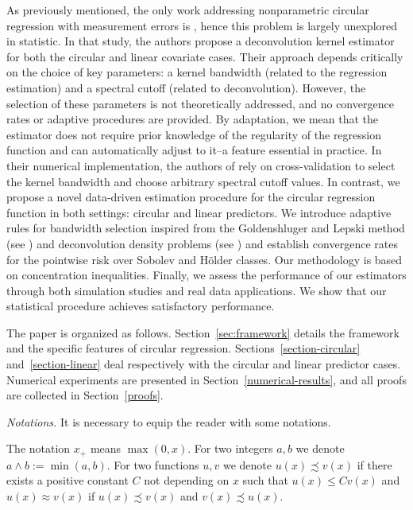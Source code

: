 \documentclass[11pt,a4paper,openany]{article}
\begin{document}
As previously mentioned, the only work addressing nonparametric circular regression with measurement errors is \cite{Di-Marzio-Fensore-Taylor}, hence this problem is largely unexplored in statistic. In that study, the authors propose a deconvolution kernel estimator for both the circular and linear covariate cases. Their approach depends critically on the choice of key parameters: a kernel  bandwidth (related to the regression estimation) and a spectral cutoff (related to deconvolution). However, the selection of these parameters is not theoretically addressed, and no convergence rates or adaptive procedures are provided. By adaptation, we mean that the estimator does not require prior knowledge of the regularity of the regression function and can automatically adjust to it--a feature essential in practice. In their numerical implementation, the authors of \cite{Di-Marzio-Fensore-Taylor} rely on cross-validation to select the kernel bandwidth and choose arbitrary spectral cutoff values. In contrast, we propose a novel data-driven estimation procedure for the circular regression function in both settings: circular and linear predictors. We introduce adaptive rules for bandwidth selection inspired from the Goldenshluger and Lepski method (see \cite{Goldenshluger-Lepski:2011}) and deconvolution density problems (see \cite{Comte-Lacour}) and establish convergence rates for the pointwise risk over Sobolev and H\"older classes. Our methodology is based on concentration inequalities. Finally, we assess the performance of our estimators through both simulation studies and real data applications. We show that our statistical procedure achieves satisfactory performance.
\medskip

The paper is organized as follows. Section~\ref{sec:framework} details the framework and the specific features of circular regression. Sections~\ref{section-circular} and~\ref{section-linear} deal respectively with the circular and linear predictor cases. Numerical experiments are presented in Section~\ref{numerical-results}, and all proofs are collected in Section~\ref{proofs}.



\medskip

 \textit{Notations.} It is necessary to equip the reader with some notations. 
 \medskip
 
 The notation $x_+$ means $\max(0,x).$ For two integers $a,b$ we denote $a \wedge b := \min(a,b)$. %
For two functions $u,v$ we denote $u(x) \precsim v(x) $ if there exists a positive constant $C$ not depending on $x$ such that $u(x) \leq C v(x)$ and $u(x) \approx v(x)$ if $u(x) \precsim v(x)$ and $v(x) \precsim u(x)$. 
\end{document}
